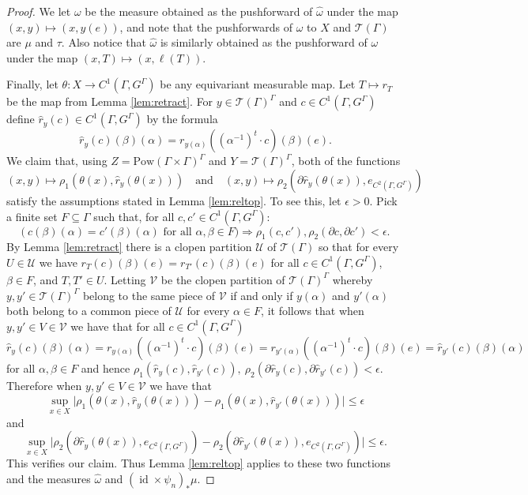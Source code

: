 \documentclass[12pt]{amsart}
\theoremstyle{definition}
\def\cal{\mathcal}
\DeclareMathOperator{\id}{id}
\newcommand{\Pow}[1]{\mathrm{Pow}(#1)}
\begin{document}
\begin{proof}
    We let $\omega$ be the measure obtained as the pushforward of $\widehat \omega$ under the map $(x, y) \mapsto (x, y(e))$, and note that the pushforwards of $\omega$ to $X$ and $\cal T(\Gamma)$ are $\mu$ and $\tau$. Also notice that $\widehat \omega$ is similarly obtained as the pushforward of $\omega$ under the map $(x,T) \mapsto (x, \ell(T))$.
	
	Finally, let $\theta : X \rightarrow C^1(\Gamma, G^\Gamma)$ be any equivariant measurable map. Let $T \mapsto r_T$ be the map from Lemma \ref{lem:retract}. For $y \in \cal T(\Gamma)^\Gamma$ and $c \in C^1(\Gamma, G^\Gamma)$ define $\hat r_y(c) \in C^1(\Gamma, G^\Gamma)$ by the formula
	\[\hat r_y(c)(\beta)(\alpha) = r_{y(\alpha)}((\alpha^{-1})^t \cdot c)(\beta)(e).\]
	We claim that, using $Z = \Pow{\Gamma \times \Gamma}^\Gamma$ and $Y = \cal T(\Gamma)^\Gamma$, both of the functions
	\[(x,y) \mapsto \rho_1(\theta(x), \hat r_y(\theta(x))) \quad \text{and} \quad (x, y) \mapsto \rho_2(\partial \hat r_y(\theta(x)), e_{C^2(\Gamma, G^\Gamma)})\]
	satisfy the assumptions stated in Lemma \ref{lem:reltop}. To see this, let $\epsilon > 0$. Pick a finite set $F \subseteq \Gamma$ such that, for all $c, c' \in C^1(\Gamma, G^\Gamma)$:
	\[ \big( \ c(\beta)(\alpha) = c'(\beta)(\alpha) \text{ for all }\alpha, \beta \in F\big) \Rightarrow \rho_1(c,c'), \rho_2(\partial c, \partial c') < \epsilon.\]
	By Lemma \ref{lem:retract} there is a clopen partition $\cal U$ of $\cal T(\Gamma)$ so that for every $U \in \cal U$ we have $r_T(c)(\beta)(e) = r_{T'}(c)(\beta)(e)$ for all $c \in C^1(\Gamma, G^\Gamma)$, $\beta \in F$, and $T, T' \in U$. Letting $\cal V$ be the clopen partition of $\cal T(\Gamma)^\Gamma$ whereby $y, y' \in \cal T(\Gamma)^\Gamma$ belong to the same piece of $\cal V$ if and only if $y(\alpha)$ and $y'(\alpha)$ both belong to a common piece of $\cal U$ for every $\alpha \in F$, it follows that when $y, y' \in V \in \cal V$ we have that for all $c \in C^1(\Gamma, G^\Gamma)$
	\[\hat r_{y}(c)(\beta)(\alpha) = r_{y(\alpha)}((\alpha^{-1})^t \cdot c)(\beta)(e) = r_{y'(\alpha)}((\alpha^{-1})^t \cdot c)(\beta)(e) = \hat r_{y'}(c)(\beta)(\alpha)\]
	for all $\alpha, \beta \in F$ and hence $\rho_1(\hat r_y(c), \hat r_{y'}(c)), \ \rho_2(\partial \hat r_y(c), \partial \hat r_{y'}(c)) < \epsilon$. Therefore when $y, y' \in V \in \cal V$ we have that
	\[\sup_{x \in X} \big| \rho_1(\theta(x), \hat r_y(\theta(x))) - \rho_1(\theta(x), \hat r_{y'}(\theta(x))) \big| \leq \epsilon\]
	and
	\[\sup_{x \in X} \big| \rho_2(\partial \hat r_y(\theta(x)), e_{C^2(\Gamma, G^\Gamma)}) - \rho_2(\partial \hat r_{y'}(\theta(x)), e_{C^2(\Gamma, G^\Gamma)}) \big| \leq \epsilon.\]
	This verifies our claim. Thus Lemma \ref{lem:reltop} applies to these two functions and the measures $\widehat \omega$ and $(\id \times \psi_n)_* \mu$.
	

\end{proof}
\end{document}
